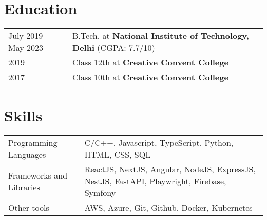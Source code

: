 \documentclass[a4paper,12pt]{article}
\begin{document}
\section{Education}
\begin{tabularx}{\linewidth}{@{}l X@{}}	
July 2019 - May 2023 & B.Tech. at \textbf{National Institute of Technology, Delhi} \hfill \normalsize (CGPA: 7.7/10) \\

2019 & Class 12th at \textbf{Creative Convent College} \\

2017 & Class 10th at \textbf{Creative Convent College} \\
\end{tabularx}

\section{Skills}
\begin{tabularx}{\linewidth}{@{}l X@{}}
Programming Languages &  \normalsize{C/C++, Javascript, TypeScript, Python, HTML, CSS, SQL}\\
Frameworks and Libraries  &  \normalsize{ReactJS, NextJS, Angular, NodeJS, ExpressJS, NestJS, FastAPI, Playwright, Firebase, Symfony}\\
Other tools  &  \normalsize{AWS, Azure, Git, Github, Docker, Kubernetes}\\
\end{tabularx}
\end{document}
